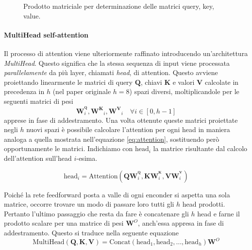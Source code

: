 \documentclass[12pt,a4paper,twoside,openright]{book}
\begin{document}
\begin{figure}
    \caption{Prodotto matriciale per determinazione delle matrici query, key, value.}
    \label{fig:qkv-prod}
\end{figure}



\paragraph{MultiHead self-attention}
Il processo di attention viene ulteriormente raffinato introducendo un'architettura \emph{MultiHead}. Questo significa che la stessa sequenza di input viene processata \emph{parallelamente} da più layer, chiamati \emph{head}, di attention.
Questo avviene proiettando linearmente le matrici di query $\mathbf{Q}$, chiavi $\mathbf{K}$ e valori $\mathbf{V}$ calcolate in precedenza in $h$ (nel paper originale $h=8$) spazi diversi, moltiplicandole per le seguenti matrici di pesi 
\begin{equation*}
    \mathbf{W}_i^\mathbf{^Q}, \mathbf{W^K}_i, \mathbf{W^V}_i \quad \forall i \in [0, h-1] 
\end{equation*}
apprese in fase di addestramento. 
Una volta ottenute queste matrici proiettate negli $h$ nuovi spazi è possibile calcolare l'attention per ogni head in maniera analoga a quella mostrata nell'equazione \ref{eq:attention}, sostituendo però opportunamente le matrici. Indichiamo con $\text{head}_i$ la matrice risultante dal calcolo dell'attention sull'head $i$-esima.  

\begin{equation*}
    \text{head}_i = \text{Attention}(\mathbf{Q} \mathbf{W}_i^\mathbf{^Q}, \mathbf{K} \mathbf{W}_i^\mathbf{^K}, \mathbf{V} \mathbf{W}_i^\mathbf{^V})
\end{equation*}

Poiché la rete feedforward posta a valle di ogni enconder si aspetta una sola matrice, occorre trovare un modo di passare loro tutti gli $h$ head prodotti. 
Pertanto l'ultimo passaggio che resta da fare è concatenare gli $h$ head e farne il prodotto scalare per una matrice di pesi $\mathbf{W}^O$, anch'essa appresa in fase di addestramento. Questo si traduce nella seguente equazione
\begin{equation*}
    \text{MultiHead}(\mathbf{Q,K,V}) = \text{Concat}(\text{head}_1, \text{head}_2, \dots, \text{head}_h)\mathbf{W}^O
\end{equation*}
\end{document}
